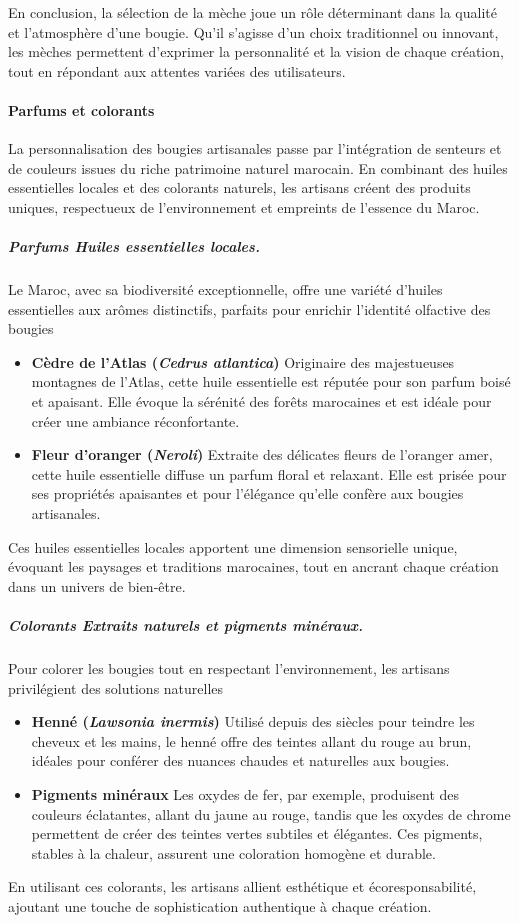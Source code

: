 \documentclass[11pt,fleqn,onecolumn,oneside]{book}
\begin{document}
En conclusion, la sélection de la mèche joue un rôle déterminant dans la qualité et l’atmosphère d’une bougie. Qu’il s’agisse d’un choix traditionnel ou innovant, les mèches permettent d’exprimer la personnalité et la vision de chaque création, tout en répondant aux attentes variées des utilisateurs.


\paragraph{Parfums et colorants} 
La personnalisation des bougies artisanales passe par l’intégration de senteurs et de couleurs issues du riche patrimoine naturel marocain. En combinant des huiles essentielles locales et des colorants naturels, les artisans créent des produits uniques, respectueux de l’environnement et empreints de l’essence du Maroc.

\subparagraph{Parfums Huiles essentielles locales.} 
Le Maroc, avec sa biodiversité exceptionnelle, offre une variété d’huiles essentielles aux arômes distinctifs, parfaits pour enrichir l’identité olfactive des bougies
\begin{itemize}
    \item \textbf{Cèdre de l’Atlas (\textit{Cedrus atlantica})} Originaire des majestueuses montagnes de l’Atlas, cette huile essentielle est réputée pour son parfum boisé et apaisant. Elle évoque la sérénité des forêts marocaines et est idéale pour créer une ambiance réconfortante.
    \item \textbf{Fleur d’oranger (\textit{Neroli})} Extraite des délicates fleurs de l’oranger amer, cette huile essentielle diffuse un parfum floral et relaxant. Elle est prisée pour ses propriétés apaisantes et pour l’élégance qu’elle confère aux bougies artisanales.
\end{itemize}
Ces huiles essentielles locales apportent une dimension sensorielle unique, évoquant les paysages et traditions marocaines, tout en ancrant chaque création dans un univers de bien-être.

\subparagraph{Colorants Extraits naturels et pigments minéraux.} 
Pour colorer les bougies tout en respectant l’environnement, les artisans privilégient des solutions naturelles
\begin{itemize}
    \item \textbf{Henné (\textit{Lawsonia inermis})} Utilisé depuis des siècles pour teindre les cheveux et les mains, le henné offre des teintes allant du rouge au brun, idéales pour conférer des nuances chaudes et naturelles aux bougies.
    \item \textbf{Pigments minéraux} Les oxydes de fer, par exemple, produisent des couleurs éclatantes, allant du jaune au rouge, tandis que les oxydes de chrome permettent de créer des teintes vertes subtiles et élégantes. Ces pigments, stables à la chaleur, assurent une coloration homogène et durable.
\end{itemize}
En utilisant ces colorants, les artisans allient esthétique et écoresponsabilité, ajoutant une touche de sophistication authentique à chaque création.
\end{document}
